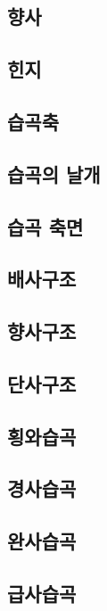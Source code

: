 \documentclass[12pt, a4paper, oneside]{book}
\begin{document}
	\subsection{향사}
	
	\subsection{힌지}


	\subsection{습곡축}
	
	\subsection{습곡의 날개}
	
	\subsection{습곡 축면}
	



	\subsection{배사구조}
	\subsection{향사구조}
	\subsection{단사구조}
	
	
	



	
	\subsection{횡와습곡}
	\subsection{경사습곡}
	
	\subsection{완사습곡}
	\subsection{급사습곡}
\end{document}
